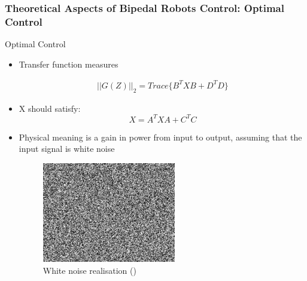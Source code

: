 \documentclass{beamer}
\begin{document}

\begin{frame}
	\frametitle{Theoretical Aspects of Bipedal Robots Control: Optimal Control}
	\begin{block}{Optimal Control}
		\begin{itemize}
			\item
				Transfer function measures
				
				\begin{equation}
					\begin{split}
						||G(Z)||_2 = Trace\{ B^{T} XB + D^{T} D \}
					\end{split}
				\end{equation}
			\item
				X should satisfy:
				\begin{equation}
					X = A^TXA + C^TC
				\end{equation}
			\item
				Physical meaning is a gain in power from input to output, assuming that the input signal is white noise
				
				\begin{figure}[h!]
					\includegraphics[width=0.1\linewidth]{presentation_images/33}
					\caption{White noise realisation (\cite{manchester2011stable})}
				\end{figure}
		\end{itemize}
	\end{block}
\end{frame}

\end{document}
